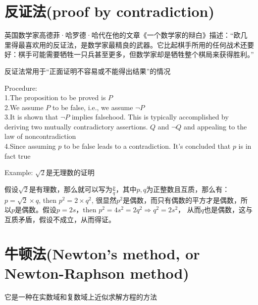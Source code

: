 \documentclass[../main.tex]{subfiles}
\begin{document}
\section{反证法(proof by contradiction)}
英国数学家高德菲·哈罗德·哈代在他的文章《一个数学家的辩白》描述：“欧几里得最喜欢用的反证法，是数学家最精良的武器。它比起棋手所用的任何战术还要好：棋手可能需要牺牲一只兵甚至更多，但数学家却是牺牲整个棋局来获得胜利。”

反证法常用于“正面证明不容易或不能得出结果”的情况

Procedure:\\
1.The proposition to be proved is $P$\\
2.We assume $P$ to be false, i.e., we assume $\neg P$\\
3.It is shown that $\neg P$ implies falsehood. This is typically accomplished by deriving two mutually contradictory assertions. $Q$ and $\neg Q$ and appealing to the law of noncontradiction\\
4.Since assuming $p$ to be false leads to a contradiction. It's concluded that $p$ is in fact true

Example: $\sqrt{2}$是无理数的证明

假设$\sqrt{2}$是有理数，那么就可以写为$\frac{p}{q}$，其中$p, q$为正整数且互质，那么有： $p=\sqrt{2}\times q$, then $p^2=2\times q^2$, 很显然$p^2$是偶数，而只有偶数的平方才是偶数，所以$p$是偶数。假设$p=2s$，then $p^2=4s^2=2q^2 \Rightarrow q^2=2s^2$， 从而$q$也是偶数，这与互质矛盾，假设不成立，从而得证。

\section{牛顿法(Newton's method, or Newton-Raphson method)}
它是一种在实数域和复数域上近似求解方程的方法
\end{document}
